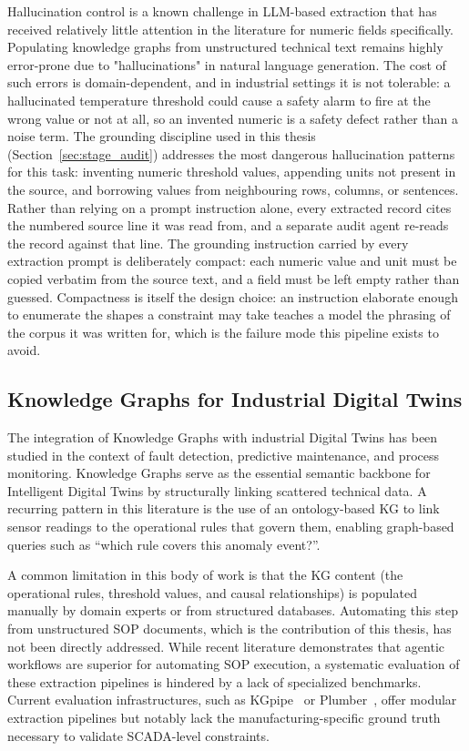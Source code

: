 \documentclass[11pt]{article}
\begin{document}
Hallucination control is a known challenge in LLM-based extraction that has
received relatively little attention in the literature for numeric fields
specifically. Populating knowledge graphs from unstructured technical text remains highly error-prone due to "hallucinations" in natural language generation.
The cost of such errors is domain-dependent, and in industrial settings it is
not tolerable: a hallucinated temperature threshold could cause a safety alarm
to fire at the wrong value or not at all, so an invented numeric is a safety
defect rather than a noise term.
The grounding discipline used in this thesis
(Section~\ref{sec:stage_audit}) addresses the most dangerous hallucination
patterns for this task: inventing numeric threshold values, appending units not
present in the source, and borrowing values from neighbouring rows, columns, or
sentences. Rather than relying on a prompt instruction alone, every extracted
record cites the numbered source line it was read from, and a separate audit
agent re-reads the record against that line. The grounding instruction carried by every extraction prompt is deliberately
compact: each numeric value and unit must be copied verbatim from the source
text, and a field must be left empty rather than guessed. Compactness is itself
the design choice: an instruction elaborate enough to enumerate the shapes a
constraint may take teaches a model the phrasing of the corpus it was written
for, which is the failure mode this pipeline exists to avoid.

\subsection{Knowledge Graphs for Industrial Digital Twins}
\label{sec:rw_dt_kg}

The integration of Knowledge Graphs with industrial Digital Twins has been
studied in the context of fault detection, predictive maintenance, and process
monitoring. Knowledge Graphs serve as the essential semantic backbone for Intelligent Digital Twins by structurally linking scattered technical data.
A recurring pattern in this literature is the use of an ontology-based KG
to link sensor readings to the operational rules that govern them, enabling
graph-based queries such as ``which rule covers this anomaly event?''.

A common limitation in this body of work is that the KG content (the
operational rules, threshold values, and causal relationships) is populated
manually by domain experts or from structured databases.
Automating this step from unstructured SOP documents, which is the contribution
of this thesis, has not been directly addressed.
While recent literature demonstrates that agentic workflows are superior for automating SOP execution, a systematic evaluation of these extraction pipelines is hindered by a lack of specialized benchmarks. Current evaluation infrastructures, such as KGpipe~\cite{hofer2025kgpipe} or Plumber~\cite{jaradeh2021plumber}, offer modular extraction pipelines but notably lack the manufacturing-specific ground truth necessary to validate SCADA-level constraints.
\end{document}
